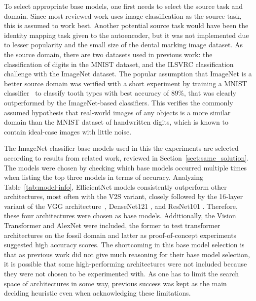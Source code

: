 \documentclass[english,twoside,openright]{UH_DS_MSc}
\begin{document}


To select appropriate base models, one first needs to select the source task and domain. Since most reviewed work uses image classification as the source task, this is assumed to work best.
Another potential source task would have been the identity mapping task given to the autoencoder,
but it was not implemented due to lesser popularity and the small size of the dental marking image dataset.
As the source domain, there are two datasets used in previous work: the classification of digits in the MNIST dataset, 
and the ILSVRC classification challenge with the ImageNet dataset. The popular 
assumption that ImageNet is a better source domain was verified with a short experiment by training a MNIST classifier~\cite{jamilemnist}
to classify tooth types with best accuracy of 89\%, that was clearly outperformed by the ImageNet-based classifiers. This verifies the commonly assumed hypothesis that real-world images of any objects is a more 
similar domain than the MNIST dataset of handwritten digits, which is known to contain ideal-case images with little noise.

The ImageNet classifier base models used in this the experiments are selected 
according to results from related work, reviewed in Section~\ref{sect:same_solution}.
The models were chosen by checking which base models 
occurred multiple times when listing the top three models in terms of accuracy. 
Analyzing Table~\ref{tab:model-info}, EfficientNet models \cite{efficientnetv2} consistently outperform 
other architectures, most often with the V2S variant, closely followed by the 16-layer variant of the VGG architecture~\cite{vgg},
DenseNet121 \cite{densenet}, and ResNet101 \cite{resnet}.
Therefore, these four architectures were chosen as base models.
Additionally, the Vision Transformer \cite{vit} and AlexNet \cite{alexnet} were included, the former to test 
transformer architectures on the fossil domain and latter
as proof-of-concept experiments suggested high accuracy scores.
The shortcoming in this base model selection is that as previous work did not give much
 reasoning for their base model selection, it is possible that some high-performing architectures were not included 
because  they were not chosen to be experimented with. As one has to limit the 
search space of architectures in some way, previous success was kept as the main deciding heuristic 
even when acknowledging these limitations.
\end{document}
